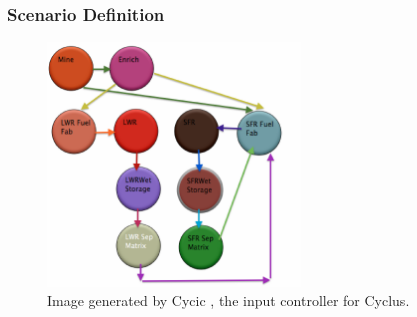 \begin{frame}[fragile]
  \frametitle{Scenario Definition}
\begin{figure}[htpb]
\begin{center}
\includegraphics[width=0.6\textwidth]{cycic_img.eps}
\end{center}
\caption{Image generated by Cycic \cite{flanagan_input_2013}, the input controller for Cyclus\cite{carlsen_cyclus_2014}.} 
\label{fig:cycic_img}
\end{figure}
\end{frame}
